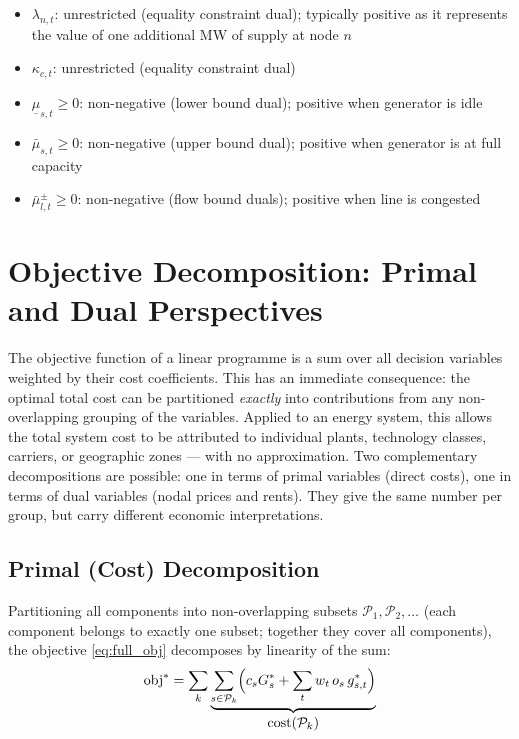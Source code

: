 \documentclass{article}
\begin{document}
\begin{tcolorbox}[colback=blue!5, colframe=blue!40!black, title={KKT Sign Summary}]
\begin{itemize}
    \item $\lambda_{n,t}$: unrestricted (equality constraint dual); typically positive
          as it represents the value of one additional MW of supply at node $n$
    \item $\kappa_{c,t}$: unrestricted (equality constraint dual)
    \item $\underline{\mu}_{s,t} \ge 0$: non-negative (lower bound dual);
          positive when generator is idle
    \item $\bar{\mu}_{s,t} \ge 0$: non-negative (upper bound dual);
          positive when generator is at full capacity
    \item $\bar{\mu}^{\pm}_{l,t} \ge 0$: non-negative (flow bound duals);
          positive when line is congested
\end{itemize}
\end{tcolorbox}

\section{Objective Decomposition: Primal and Dual Perspectives}
\label{sec:decomposition}

The objective function of a linear programme is a sum over all decision
variables weighted by their cost coefficients. This has an immediate
consequence: the optimal total cost can be partitioned \emph{exactly} into
contributions from any non-overlapping grouping of the variables. Applied to
an energy system, this allows the total system cost to be attributed to
individual plants, technology classes, carriers, or geographic zones --- with
no approximation. Two complementary decompositions are possible: one in terms
of primal variables (direct costs), one in terms of dual variables (nodal
prices and rents). They give the same number per group, but carry different
economic interpretations.

\subsection{Primal (Cost) Decomposition}

Partitioning all components into non-overlapping subsets
$\mathcal{P}_1, \mathcal{P}_2, \ldots$ (each component belongs to exactly
one subset; together they cover all components), the objective
\eqref{eq:full_obj} decomposes by linearity of the sum:
\begin{equation}
    \text{obj}^*
    = \sum_k \underbrace{\sum_{s \in \mathcal{P}_k}
      \Bigl(c_s G_s^* + \sum_t w_t\, o_s\, g_{s,t}^*\Bigr)}_{\displaystyle\text{cost}(\mathcal{P}_k)}
    \label{eq:primal_decomp}
\end{equation}
\end{document}
